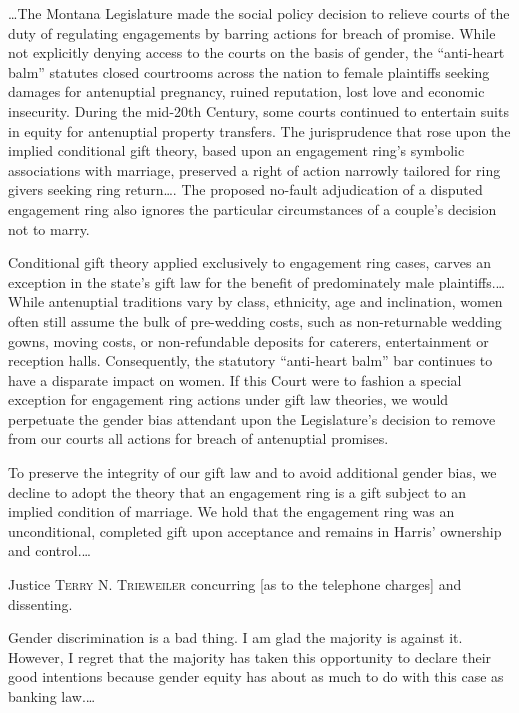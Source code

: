 
\dots The Montana Legislature made the social policy decision to relieve
courts of the duty of regulating engagements by barring actions for breach of
promise. While not explicitly denying access to the courts on the basis of
gender, the ``anti-heart balm'' statutes closed courtrooms across the nation to
female plaintiffs seeking damages for antenuptial pregnancy, ruined reputation,
lost love and economic insecurity. During the mid-20th Century, some courts
continued to entertain suits in equity for antenuptial property transfers. The
jurisprudence that rose upon the implied conditional gift theory, based upon an
engagement ring's symbolic associations with marriage, preserved a right of
action narrowly tailored for ring givers seeking ring return\dots. The
proposed no-fault adjudication of a disputed engagement ring also ignores the
particular circumstances of a couple's decision not to marry.

Conditional gift theory applied exclusively to engagement ring cases, carves an
exception in the state's gift law for the benefit of predominately male
plaintiffs.\dots While antenuptial traditions vary by class, ethnicity, age
and inclination, women often still assume the bulk of pre-wedding costs, such
as non-returnable wedding gowns, moving costs, or non-refundable deposits for
caterers, entertainment or reception halls. Consequently, the statutory
``anti-heart balm'' bar continues to have a disparate impact on women. If this
Court were to fashion a special exception for engagement ring actions under
gift law theories, we would perpetuate the gender bias attendant upon the
Legislature's decision to remove from our courts all actions for breach of
antenuptial promises. 


To preserve the integrity of our gift law and to avoid additional gender bias,
we decline to adopt the theory that an engagement ring is a gift subject to an
implied condition of marriage. We hold that the engagement ring was an
unconditional, completed gift upon acceptance and remains in Harris' ownership
and control.\dots

\opinion Justice \textsc{Terry N. Trieweiler} concurring [as to the telephone
charges] and dissenting.

Gender discrimination is a bad thing. I am glad the majority is against it.
However, I regret that the majority has taken this opportunity to declare their
good intentions because gender equity has about as much to do with this case as
banking law.\dots

